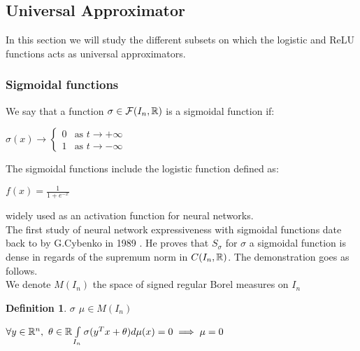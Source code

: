 \documentclass[12pt]{article}
\newtheorem{definition}{Definition}
\begin{document}
\subsection{Universal Approximator}

In this section we will study the different subsets on which the logistic and ReLU functions acts as universal approximators.\\ 

\subsubsection{Sigmoidal functions}

We say that a function $\sigma \in \mathcal{F}(I_n, \mathbb{R})$ is a sigmoidal function if:\\

\begin{center}
  $\sigma(x) \to
  \begin{cases}
    0 &\text{as $t \to +\infty$}\\
    1 &\text{as $t \to -\infty$}
  \end{cases}$
\end{center}

The sigmoidal functions include the logistic function defined as:\\

\begin{center}
  $f(x) = \frac{1}{1+e^{-x}}$
\end{center}

widely used as an activation function for neural networks.\\

The first study of neural network expressiveness with sigmoidal functions date back to by G.Cybenko in 1989 \cite{cybenko_approximation_1989}. He proves that $S_\sigma$ for $\sigma$ a sigmoidal function is dense in regards of the supremum norm in $C(I_n, \mathbb{R})$. The demonstration goes as follows.\\

We denote $M(I_n)$ the space of signed regular Borel measures on $I_n$\\

\begin{definition}
  $\sigma$  $\mu \in M(I_n)$ \\ 
  \begin{center}
  $\forall y \in \mathbb{R}^n,$ $\theta \in \mathbb{R} \int\limits_{I_n} \sigma(y^Tx + \theta) d\mu(x) = 0 \implies \mu = 0$
\end{center}
\end{definition}
\end{document}
